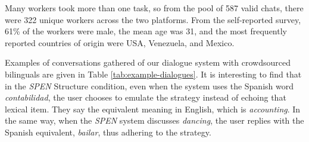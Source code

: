 \documentclass[11pt,a4paper]{article}
\begin{document}
Many workers took more than one task, so from the pool of 587 valid chats, there were 322 unique workers across the two platforms. 
From the self-reported survey, 61\% of the workers were male, the mean age was 31, and the most frequently reported countries of origin were USA, Venezuela, and Mexico.

Examples of conversations gathered of our dialogue system with crowdsourced bilinguals are given in Table \ref{tab:example-dialogues}.
It is interesting to find that in the \textit{SP\textrightarrow EN} Structure condition, even when the system uses the Spanish word \textit{contabilidad}, the user chooses to emulate the strategy instead of echoing that lexical item.
They say the equivalent meaning in English, which is \textit{accounting}.
In the same way, when the \textit{SP\textrightarrow EN} system discusses \textit{dancing}, the user replies with the Spanish equivalent, \textit{bailar}, thus adhering to the strategy.
\end{document}
